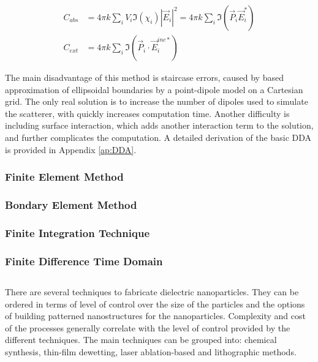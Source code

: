             \begin{align}
                C_{abs} &= 4\pi k \sum_i V_i \Im(\chi_i)|\vec{E}_i|^2 = 4\pi k \sum_i \Im(\vec{P}_i\vec{E}_i^*) \\
                C_{ext} &= 4\pi k \sum_i \Im (\vec{P}_i\cdot\vec{E}_i^{inc*})
            \end{align}

                The main disadvantage of this method is staircase errors, caused by based approximation of ellipsoidal boundaries by a point-dipole
            model on a Cartesian grid. The only real solution is to increase the number of dipoles used to simulate the scatterer, with quickly increases
            computation time. Another difficulty is including surface interaction, which adds another interaction term to the solution, and further
            complicates the computation. A detailed derivation of the basic DDA is provided in Appendix \ref{ap:DDA}.

        \subsubsection{Finite Element Method}


        \subsubsection{Bondary Element Method}

        \subsubsection{Finite Integration Technique}

        \subsubsection{Finite Difference Time Domain}

    \subsection{}
            There are several techniques to fabricate dielectric nanoparticles. They can be ordered in terms of level of control over the size
        of the particles and the options of building patterned nanostructures for the nanoparticles. Complexity and cost of the processes generally
        correlate with the level of control provided by the different techniques.
            The main techniques can be grouped into: chemical synthesis\cite{shi2012new}, thin-film dewetting\cite{abbarchi2014wafer},
        laser ablation-based\cite{zywietz2014laser} and lithographic methods.

